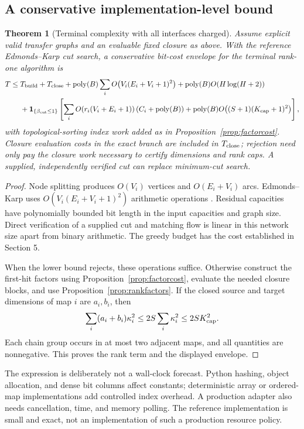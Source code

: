 \documentclass[11pt,letterpaper]{article}
\newtheorem{theorem}{Theorem}[section]
\theoremstyle{definition}\newtheorem{definition}[theorem]{Definition}
\theoremstyle{remark}\newtheorem{remark}[theorem]{Remark}
\newcommand{\poly}{\operatorname{poly}}
\newcommand{\cutlb}{\beta_{\mathrm{cut}}}
\begin{document}
\subsection{A conservative implementation-level bound}
\begin{theorem}[Terminal complexity with all interfaces charged]
\label{thm:complexity}
Assume explicit valid transfer graphs and an evaluable fixed closure as
above. With the reference Edmonds--Karp cut search, a conservative bit-cost
envelope for the terminal rank-one algorithm is
\begin{align}
T\leq{}&T_{\rm build}+T_{\rm close}
 +\poly(B)\sum_i O\!\left(V_i(E_i+V_i+1)^2\right)
 +\poly(B)O\!\left(H\log(H+2)\right)\notag\\
&+\mathbf 1_{\{\cutlb\leq1\}}\left[
 \sum_i O\!\left(r_i(V_i+E_i+1)\right)(C_i+\poly(B))
 +\poly(B)O\!\left((S+1)(K_{\rm cap}+1)^2\right)\right],
\label{eq:complexity}
\end{align}
with topological-sorting index work added as in
Proposition~\ref{prop:factorcost}. Closure evaluation costs in the exact
branch are included in $T_{\rm close}$; rejection need only pay the closure
work necessary to certify dimensions and rank caps. A supplied, independently
verified cut can replace minimum-cut search.
\end{theorem}
\begin{proof}
Node splitting produces $O(V_i)$ vertices and $O(E_i+V_i)$ arcs.
Edmonds--Karp uses $O(V_i(E_i+V_i+1)^2)$ arithmetic operations
\cite{edmondskarp1972}. Residual capacities have polynomially bounded bit
length in the input capacities and graph size. Direct verification of a
supplied cut and matching flow is linear in this network size apart from
binary arithmetic. The greedy budget has the cost established in Section 5.

When the lower bound rejects, these operations suffice. Otherwise construct
the first-hit factors using Proposition~\ref{prop:factorcost}, evaluate the
needed closure blocks, and use Proposition~\ref{prop:rankfactors}. If the
closed source and target dimensions of map $i$ are $a_i,b_i$, then
\[
 \sum_i(a_i+b_i)\kappa_i^2
 \leq 2S\sum_i\kappa_i^2
 \leq 2S K_{\rm cap}^2.
\]
Each chain group occurs in at most two adjacent maps, and all quantities are
nonnegative. This proves the rank term and the displayed envelope.
\end{proof}

The expression is deliberately not a wall-clock forecast. Python hashing,
object allocation, and dense bit columns affect constants; deterministic
array or ordered-map implementations add controlled index overhead. A
production adapter also needs cancellation, time, and memory polling.
The reference implementation is small and exact, not an implementation of
such a production resource policy.
\end{document}

